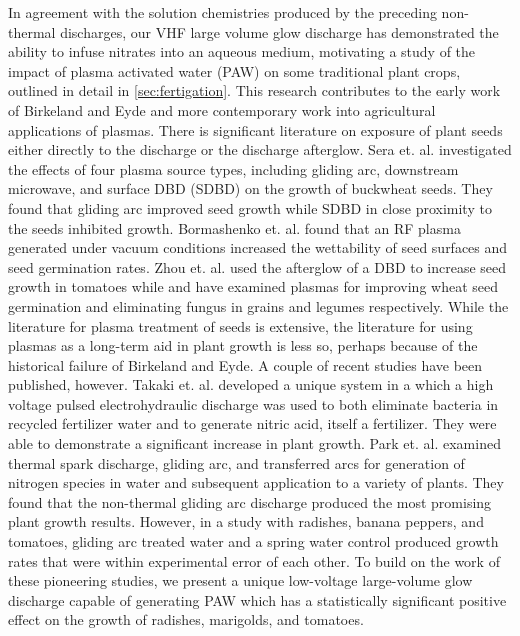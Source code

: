 In agreement with the solution chemistries produced by the preceding non-thermal discharges, our VHF large volume glow discharge has demonstrated the ability to infuse nitrates into an aqueous medium, motivating a study of the impact of plasma activated water (PAW) on some traditional plant crops, outlined in detail in \cref{sec:fertigation}. This research contributes to the early work of Birkeland and Eyde and more contemporary work into agricultural applications of plasmas. There is significant literature on exposure of plant seeds either directly to the discharge or the discharge afterglow. Sera et. al.\cite{vsera2012various} investigated the effects of four plasma source types, including gliding arc, downstream microwave, and surface DBD (SDBD) on the growth of buckwheat seeds. They found that gliding arc improved seed growth while SDBD in close proximity to the seeds inhibited growth. Bormashenko et. al.\cite{bormashenko2012cold} found that an RF plasma generated under vacuum conditions increased the wettability of seed surfaces and seed germination rates. Zhou et. al.\cite{zhou2011introduction} used the afterglow of a DBD to increase seed growth in tomatoes while \cite{huang2010effect} and \cite{filatova2012fungicidal} have examined plasmas for improving wheat seed germination and eliminating fungus in grains and legumes respectively. While the literature for plasma treatment of seeds is extensive, the literature for using plasmas as a long-term aid in plant growth is less so, perhaps because of the historical failure of Birkeland and Eyde. A couple of recent studies have been published, however. Takaki et. al.\cite{takaki2013improvements} developed a unique system in a which a high voltage pulsed electrohydraulic discharge was used to both eliminate bacteria in recycled fertilizer water and to generate nitric acid, itself a fertilizer. They were able to demonstrate a significant increase in plant growth. Park et. al.\cite{park2013reactive} examined thermal spark discharge, gliding arc, and transferred arcs for generation of nitrogen species in water and subsequent application to a variety of plants. They found that the non-thermal gliding arc discharge produced the most promising plant growth results. However, in a study with radishes, banana peppers, and tomatoes, gliding arc treated water and a spring water control produced growth rates that were within experimental error of each other. To build on the work of these pioneering studies, we present a unique low-voltage large-volume glow discharge capable of generating PAW which has a statistically significant positive effect on the growth of radishes, marigolds, and tomatoes.

